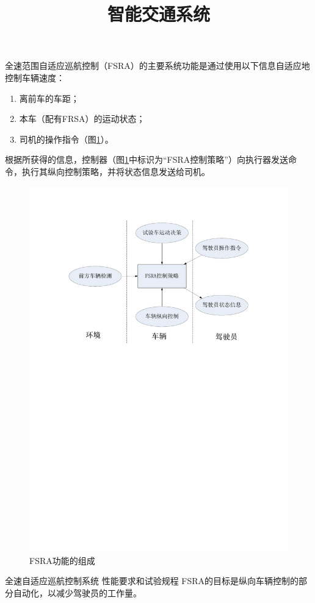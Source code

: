 \documentclass[is,copyright,is]{isov2}
\begin{document}
\begin{foreword}
\fwdbp
\end{foreword}
\begin{introduction} %
	 全速范围自适应巡航控制（FSRA）的主要系统功能是通过使用以下信息自适应地控制车辆速度：
	 \begin{enumerate}
	 	\item 离前车的车距；
	 	\item 本车（配有FRSA）的运动状态；
	 	\item 司机的操作指令（图\ref{fig:fsracontrolmode}）。
	 \end{enumerate}
 根据所获得的信息，控制器（图\ref{fig:fsracontrolmode}中标识为“FSRA控制策略”）向执行器发送命令，执行其纵向控制策略，并将状态信息发送给司机。
\begin{figure}[htbp]
	\centering
	\includegraphics[width=0.7\linewidth]{figures/FSRAcontrolmode}
	\caption{FSRA功能的组成}
	\label{fig:fsracontrolmode}
\end{figure}
\end{introduction}
\title{\noindent 智能交通系统}%
{全速自适应巡航控制系统}%
{性能要求和试验规程}
FSRA的目标是纵向车辆控制的部分自动化，以减少驾驶员的工作量。
\end{document}
